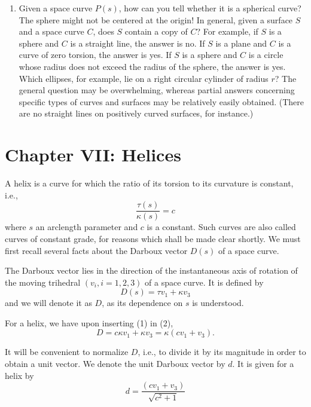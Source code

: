 \documentclass{book}
\begin{document}
\begin{enumerate}[1.]
  \item Given a space curve $P(s)$, how can you tell whether it is a spherical curve? The sphere might not be centered at the origin! In general, given a surface $S$ and a space curve $C$, does $S$ contain a copy of $C$? For example, if $S$ is a sphere and $C$ is a straight line, the answer is no. If $S$ is a plane and $C$ is a curve of zero torsion, the answer is yes. If $S$ is a sphere and $C$ is a circle whose radius does not exceed the radius of the sphere, the answer is yes. Which ellipses, for example, lie on a right circular cylinder of radius $r$? The general question may be overwhelming, whereas partial answers concerning specific types of curves and surfaces may be relatively easily obtained. (There are no straight lines on positively curved surfaces, for instance.)
\end{enumerate}



\chapter*{Chapter VII: Helices}

\setcounter{equation}{0}

A helix is a curve for which the ratio of its torsion to its curvature is constant, i.e.,
\begin{equation}
\frac{\tau(s)}{\kappa(s)} = c
\end{equation}
where $s$ an arclength parameter and $c$ is a constant. Such curves are also called curves of constant grade, for reasons which shall be made clear shortly. We must first recall several facts about the Darboux vector $D(s)$ of a space curve.

The Darboux vector lies in the direction of the instantaneous axis of rotation of the moving trihedral $(v_{i}, i = 1,2,3)$ of a space curve. It is defined by
\begin{equation}
D(s) = \tau v_{1} + \kappa v_{3}
\end{equation}
and we will denote it as $D$, as its dependence on $s$ is understood.

For a helix, we have upon inserting (1) in (2),
\begin{equation}
D = c \kappa v_{1} + \kappa v_{3} = \kappa(cv_{1} + v_{3}).
\end{equation}

It will be convenient to normalize $D$, i.e., to divide it by its magnitude in order to obtain a unit vector. We denote the unit Darboux vector by $d$. It is given for a helix by
\begin{equation}
d = \frac{ (cv_{1} + v_{3}) }{ \sqrt{c^{2} + 1} }
\end{equation}
\end{document}

